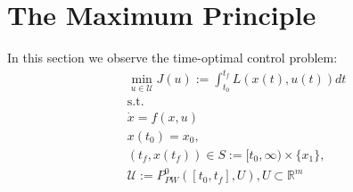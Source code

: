 \newpage
\section{The Maximum Principle}
In this section we observe the time-optimal control problem:
\begin{equation}\tag{(P3.1)}\label{prob:P3.1}
\begin{aligned}
	& \min_{u \in \mathcal{U}} J(u):= \int_{t_0}^{t_f} L(x(t), u(t))dt \\
	& \text{s.t.}\\
	& \dot{x} = f(x, u)\\
	& x(t_0) = x_0, \\
	& (t_f, x(t_f)) \in S:= [t_0, \infty) \times \{x_1\},\\ 
	& \mathcal{U}:= P_{PW}^0([t_0, t_f], U), U \subset \mathbb{R}^m
\end{aligned}
\end{equation}

